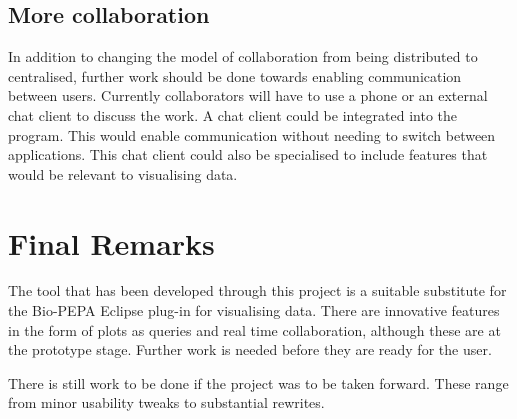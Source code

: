 \subsection{More collaboration}
In addition to changing the model of collaboration from being distributed to centralised, further work should be done towards enabling communication between users.  Currently collaborators will have to use a phone or an external chat client to discuss the work.  A chat client could be integrated into the program.  This would enable communication without needing to switch between applications.  This chat client could also be specialised to include features that would be relevant to visualising data.

\section{Final Remarks}

The tool that has been developed through this project is a suitable substitute for the Bio-PEPA Eclipse plug-in for visualising data.  There are innovative features in the form of plots as queries and real time collaboration, although these are at the prototype stage.  Further work is needed before they are ready for the user.

There is still work to be done if the project was to be taken forward.  These range from minor usability tweaks to substantial rewrites.

